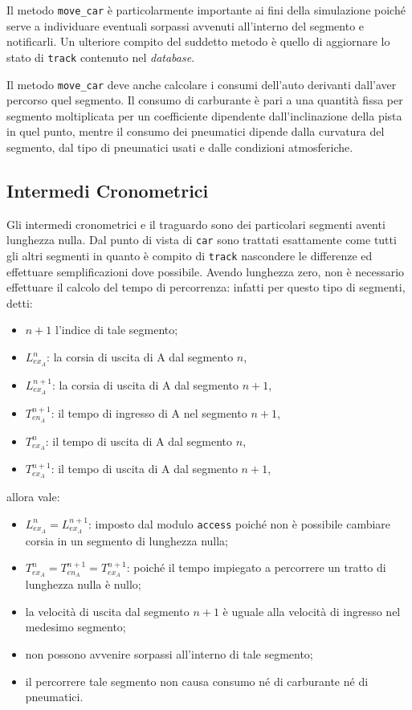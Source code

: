 \documentclass[a4paper]{report}
\newcommand{\fun}[1]{\texttt{#1}}
\begin{document}
Il metodo \fun{move\_car} è particolarmente importante ai fini della simulazione poiché serve a individuare eventuali sorpassi avvenuti all'interno del segmento e notificarli. Un ulteriore compito del suddetto metodo è quello di aggiornare lo stato di \texttt{track} contenuto nel \textit{database}.

Il metodo \fun{move\_car} deve anche calcolare i consumi dell'auto derivanti dall'aver percorso quel segmento.
Il consumo di carburante è pari a una quantità fissa per segmento moltiplicata per un coefficiente dipendente dall'inclinazione della pista in quel punto, mentre il consumo dei pneumatici dipende dalla curvatura del segmento, dal tipo di pneumatici usati e dalle condizioni atmosferiche.

\subsection{Intermedi Cronometrici}
Gli intermedi cronometrici e il traguardo sono dei particolari segmenti aventi lunghezza nulla. Dal punto di vista di \texttt{car} sono trattati esattamente come tutti gli altri segmenti in quanto è compito di \texttt{track} nascondere le differenze ed effettuare semplificazioni dove possibile. Avendo lunghezza zero, non è necessario effettuare il calcolo del tempo di percorrenza: infatti per questo tipo di segmenti, detti:
\begin{itemize}
\item $n+1$ l'indice di tale segmento;
\item $L_{ex_A}^{n}$: la corsia di uscita di A dal segmento $n$,
\item $L_{ex_A}^{n+1}$: la corsia di uscita di A dal segmento $n+1$,
\item $T_{en_A}^{n+1}$: il tempo di ingresso di A nel segmento $n+1$,
\item $T_{ex_A}^{n}$: il tempo di uscita di A dal segmento $n$,
\item $T_{ex_A}^{n+1}$: il tempo di uscita di A dal segmento $n+1$,
\end{itemize}
allora vale:
\begin{itemize}
\item $L_{ex_A}^{n} = L_{ex_A}^{n+1}$: imposto dal modulo \texttt{access} poiché non è possibile cambiare corsia in un segmento di lunghezza nulla;
\item $T_{ex_A}^{n} = T_{en_A}^{n+1} = T_{ex_A}^{n+1}$: poiché il tempo impiegato a percorrere un tratto di lunghezza nulla è nullo;
\item la velocità di uscita dal segmento $n+1$ è uguale alla velocità di ingresso nel medesimo segmento;
\item non possono avvenire sorpassi all'interno di tale segmento;
\item il percorrere tale segmento non causa consumo né di carburante né di pneumatici.
\end{itemize}
\end{document}
